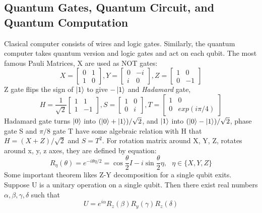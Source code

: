 \documentclass{article}
\begin{document}
\subsection*{Quantum Gates, Quantum Circuit, and Quantum Computation}
Clasical computer consists of wires and logic gates. Similarly, 
the quantum computer takes quantum version and logic gates and act on 
each qubit. The most famous Pauli Matrices, X are used as NOT gates: 
\begin{equation}
  X = \begin{bmatrix}
    0 & 1 \\ 1 & 0 
  \end{bmatrix},
  Y = \begin{bmatrix}
    0 & -i \\ i & 0 
  \end{bmatrix},
  Z = \begin{bmatrix}
    1 & 0 \\ 0 & -1 
  \end{bmatrix}
\end{equation}
Z gate flips the sign of $\ket{1}$ to give $-\ket{1}$ and 
\textit{Hadamard} gate, 
\begin{equation}
  H =  \frac{1}{\sqrt{2}}\begin{bmatrix}
    1 & 1 \\ 1 & -1
  \end{bmatrix}, S = \begin{bmatrix}
    1 & 0 \\ 0 & i
  \end{bmatrix}, T = \begin{bmatrix}
    1 & 0 \\ 0 & exp(i \pi/4)
  \end{bmatrix}
\end{equation}
Hadamard gate turns $\ket{0}$ into $(\ket{0}+\ket{1})/\sqrt{2}$, and 
$\ket{1}$ into $(\ket{0}-\ket{1})/\sqrt{2}$, phase gate S and $\pi/8$ gate T 
have some algebraic relation with H that $H = (X+Z)/\sqrt{2}$ and 
$S = T^2$. For rotation matrix around X, Y, Z, rotates around x, y, z axes, 
they are defined by equation:
$$R_{\eta}(\theta) = e^{-i \theta \eta /2} = \cos \frac{\theta}{2}I -i \sin \frac{\theta}{2} \eta, \ \ \ \eta \in \{X,Y,Z\}$$
Some important theorem likes Z-Y decomposition for a single qubit 
exits. Suppose U is a unitary operation on a single qubit. Then there exist
real numbers $\alpha, \beta, \gamma, \delta$ such that 
\begin{equation}
  U = e^{i \alpha} R_z(\beta) R_y (\gamma) R_z(\delta)
\end{equation}
\end{document}
